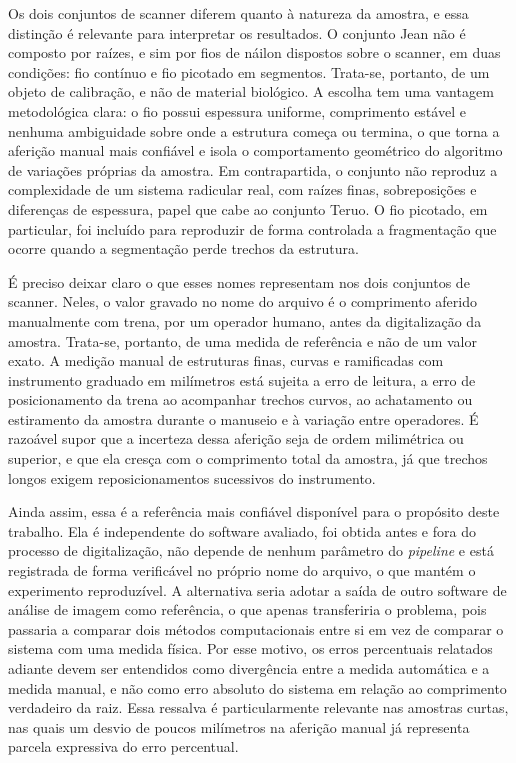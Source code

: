 \documentclass[12pt]{article}
\begin{document}
Os dois conjuntos de scanner diferem quanto à natureza da amostra, e essa distinção é relevante para interpretar os resultados. O conjunto Jean não é composto por raízes, e sim por fios de náilon dispostos sobre o scanner, em duas condições: fio contínuo e fio picotado em segmentos. Trata-se, portanto, de um objeto de calibração, e não de material biológico. A escolha tem uma vantagem metodológica clara: o fio possui espessura uniforme, comprimento estável e nenhuma ambiguidade sobre onde a estrutura começa ou termina, o que torna a aferição manual mais confiável e isola o comportamento geométrico do algoritmo de variações próprias da amostra. Em contrapartida, o conjunto não reproduz a complexidade de um sistema radicular real, com raízes finas, sobreposições e diferenças de espessura, papel que cabe ao conjunto Teruo. O fio picotado, em particular, foi incluído para reproduzir de forma controlada a fragmentação que ocorre quando a segmentação perde trechos da estrutura.

É preciso deixar claro o que esses nomes representam nos dois conjuntos de scanner. Neles, o valor gravado no nome do arquivo é o comprimento aferido manualmente com trena, por um operador humano, antes da digitalização da amostra. Trata-se, portanto, de uma medida de referência e não de um valor exato. A medição manual de estruturas finas, curvas e ramificadas com instrumento graduado em milímetros está sujeita a erro de leitura, a erro de posicionamento da trena ao acompanhar trechos curvos, ao achatamento ou estiramento da amostra durante o manuseio e à variação entre operadores. É razoável supor que a incerteza dessa aferição seja de ordem milimétrica ou superior, e que ela cresça com o comprimento total da amostra, já que trechos longos exigem reposicionamentos sucessivos do instrumento.

Ainda assim, essa é a referência mais confiável disponível para o propósito deste trabalho. Ela é independente do software avaliado, foi obtida antes e fora do processo de digitalização, não depende de nenhum parâmetro do \textit{pipeline} e está registrada de forma verificável no próprio nome do arquivo, o que mantém o experimento reproduzível. A alternativa seria adotar a saída de outro software de análise de imagem como referência, o que apenas transferiria o problema, pois passaria a comparar dois métodos computacionais entre si em vez de comparar o sistema com uma medida física. Por esse motivo, os erros percentuais relatados adiante devem ser entendidos como divergência entre a medida automática e a medida manual, e não como erro absoluto do sistema em relação ao comprimento verdadeiro da raiz. Essa ressalva é particularmente relevante nas amostras curtas, nas quais um desvio de poucos milímetros na aferição manual já representa parcela expressiva do erro percentual.
\end{document}
